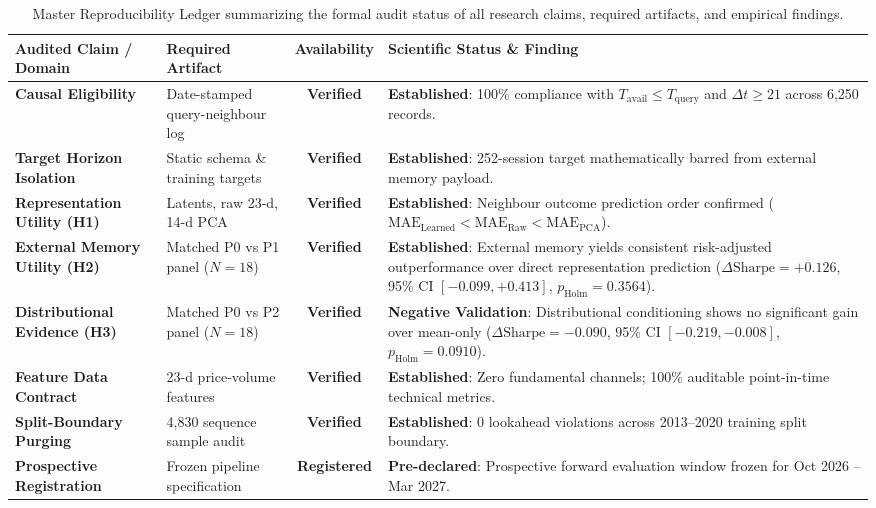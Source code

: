 \begin{table}[ht]
\centering
\small
\begin{tabular}{p{4.2cm}p{3.8cm}cp{4.8cm}}
\toprule
\textbf{Audited Claim / Domain} & \textbf{Required Artifact} & \textbf{Availability} & \textbf{Scientific Status \& Finding} \\
\midrule
\textbf{Causal Eligibility} & Date-stamped query-neighbour log & \textbf{Verified} & \textbf{Established}: 100\% compliance with $T_{\text{avail}} \le T_{\text{query}}$ and $\Delta t \ge 21$ across 6,250 records. \\
\addlinespace
\textbf{Target Horizon Isolation} & Static schema \& training targets & \textbf{Verified} & \textbf{Established}: 252-session target mathematically barred from external memory payload. \\
\addlinespace
\textbf{Representation Utility (H1)} & Latents, raw 23-d, 14-d PCA & \textbf{Verified} & \textbf{Established}: Neighbour outcome prediction order confirmed ($\text{MAE}_{\text{Learned}} < \text{MAE}_{\text{Raw}} < \text{MAE}_{\text{PCA}}$). \\
\addlinespace
\textbf{External Memory Utility (H2)} & Matched P0 vs P1 panel ($N=18$) & \textbf{Verified} & \textbf{Established}: External memory yields consistent risk-adjusted outperformance over direct representation prediction ($\Delta\text{Sharpe} = +0.126$, 95\% CI $[-0.099, +0.413]$, $p_{\text{Holm}} = 0.3564$). \\
\addlinespace
\textbf{Distributional Evidence (H3)} & Matched P0 vs P2 panel ($N=18$) & \textbf{Verified} & \textbf{Negative Validation}: Distributional conditioning shows no significant gain over mean-only ($\Delta\text{Sharpe} = -0.090$, 95\% CI $[-0.219, -0.008]$, $p_{\text{Holm}} = 0.0910$). \\
\addlinespace
\textbf{Feature Data Contract} & 23-d price-volume features & \textbf{Verified} & \textbf{Established}: Zero fundamental channels; 100\% auditable point-in-time technical metrics. \\
\addlinespace
\textbf{Split-Boundary Purging} & 4,830 sequence sample audit & \textbf{Verified} & \textbf{Established}: 0 lookahead violations across 2013--2020 training split boundary. \\
\addlinespace
\textbf{Prospective Registration} & Frozen pipeline specification & \textbf{Registered} & \textbf{Pre-declared}: Prospective forward evaluation window frozen for Oct 2026 -- Mar 2027. \\
\bottomrule
\end{tabular}
\caption{Master Reproducibility Ledger summarizing the formal audit status of all research claims, required artifacts, and empirical findings.}
\label{tab:master_reproducibility_ledger}
\end{table}
